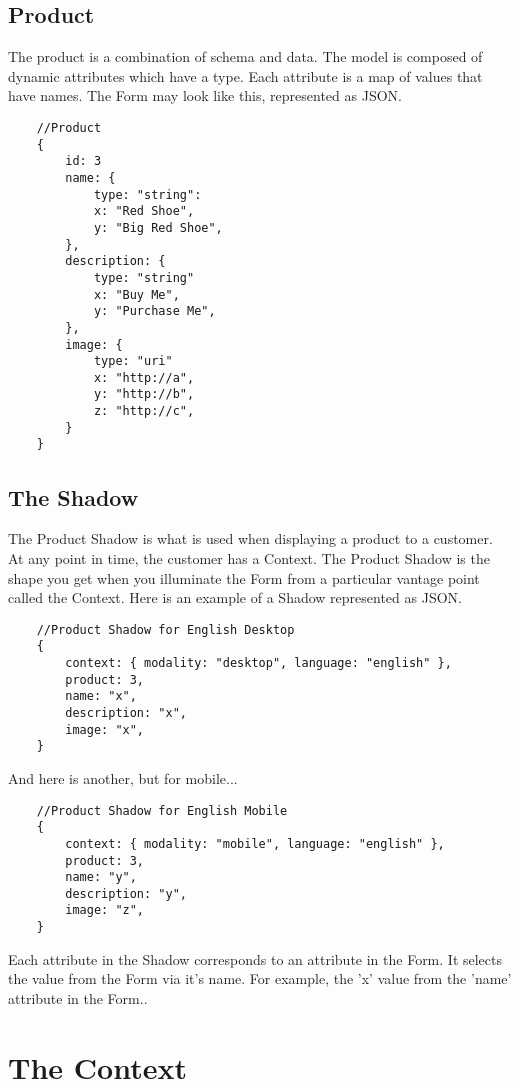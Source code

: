 \documentclass[11pt]{article}
\begin{document}
\newpage
\subsection{Product}
The product is a combination of schema and data. The model is composed of dynamic
attributes which have a type. Each attribute is a map of values that have names.
The Form may look like this, represented as JSON.

\begin{lstlisting}
    //Product 
    {
        id: 3
        name: { 
            type: "string": 
            x: "Red Shoe", 
            y: "Big Red Shoe", 
        },
        description: { 
            type: "string"
            x: "Buy Me", 
            y: "Purchase Me", 
        },
        image: { 
            type: "uri"
            x: "http://a", 
            y: "http://b", 
            z: "http://c",  
        } 
    }
\end{lstlisting}


\newpage
\subsection{The Shadow}
The Product Shadow is what is used when displaying a product to a customer.
At any point in time, the customer has a Context. The Product Shadow is the shape 
you get when you illuminate the Form from a particular vantage point called the Context.  
Here is an example of a Shadow represented as JSON.

\begin{lstlisting}
    //Product Shadow for English Desktop
    {
        context: { modality: "desktop", language: "english" },
        product: 3,
        name: "x",
        description: "x",
        image: "x",
    }
\end{lstlisting}

And here is another, but for mobile...

\begin{lstlisting}
    //Product Shadow for English Mobile
    {
        context: { modality: "mobile", language: "english" },
        product: 3,
        name: "y",
        description: "y",
        image: "z",
    }
\end{lstlisting}

Each attribute in the Shadow corresponds to an attribute in the Form. It selects
the value from the Form via it's name. For example, the 'x' value from the 'name' 
attribute in the Form..


\section{The Context}
\end{document}
